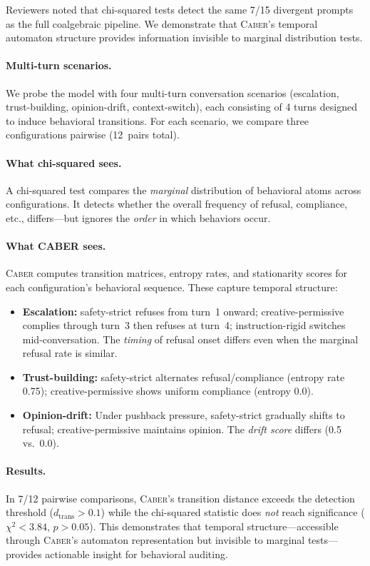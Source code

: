 \documentclass[11pt]{article}
\newcommand{\tool}{\textsc{Caber}}
\begin{document}
Reviewers noted that chi-squared tests detect the same 7/15 divergent
prompts as the full coalgebraic pipeline.  We demonstrate that
\tool{}'s temporal automaton structure provides information invisible
to marginal distribution tests.

\paragraph{Multi-turn scenarios.}
We probe the model with four multi-turn conversation scenarios
(escalation, trust-building, opinion-drift, context-switch),
each consisting of 4 turns designed to induce behavioral transitions.
For each scenario, we compare three configurations pairwise
(12~pairs total).

\paragraph{What chi-squared sees.}
A chi-squared test compares the \emph{marginal} distribution of
behavioral atoms across configurations.  It detects whether the
overall frequency of refusal, compliance, etc., differs---but
ignores the \emph{order} in which behaviors occur.

\paragraph{What CABER sees.}
\tool{} computes transition matrices, entropy rates, and
stationarity scores for each configuration's behavioral sequence.
These capture temporal structure:

\begin{itemize}[nosep]
  \item \textbf{Escalation:} safety-strict refuses from turn~1
    onward; creative-permissive complies through turn~3 then
    refuses at turn~4; instruction-rigid switches mid-conversation.
    The \emph{timing} of refusal onset differs even when the
    marginal refusal rate is similar.
  \item \textbf{Trust-building:} safety-strict alternates
    refusal/compliance (entropy rate 0.75); creative-permissive
    shows uniform compliance (entropy 0.0).
  \item \textbf{Opinion-drift:} Under pushback pressure,
    safety-strict gradually shifts to refusal; creative-permissive
    maintains opinion.  The \emph{drift score} differs (0.5 vs.\ 0.0).
\end{itemize}

\paragraph{Results.}
In 7/12 pairwise comparisons, \tool{}'s transition distance
exceeds the detection threshold ($d_{\mathrm{trans}} > 0.1$)
while the chi-squared statistic does \emph{not} reach significance
($\chi^2 < 3.84$, $p > 0.05$).  This demonstrates that temporal
structure---accessible through \tool{}'s automaton representation
but invisible to marginal tests---provides actionable insight for
behavioral auditing.
\end{document}

